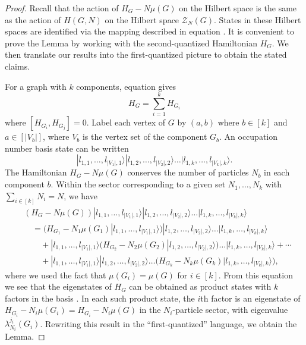 \documentclass[../thesis-main/thesis-main]{subfiles}
\begin{document}
\begin{proof}
Recall that the action of $H_{G}-N\mu(G)$ on the Hilbert space  is the same as the action of $H(G,N)$ on the Hilbert space $\mathcal{Z}_{N}(G)$. States in these Hilbert spaces are identified via the mapping described in equation . It is convenient to prove the Lemma by working with the second-quantized Hamiltonian $H_{G}$. We then translate our results into the first-quantized picture to obtain the stated claims.

For a graph with $k$ components, equation  gives 
\begin{equation}
H_{G}=\sum_{i=1}^{k}H_{G_{i}}\label{eq:H_G_disconnected}
\end{equation}
where $[H_{G_{i}},H_{G_{j}}]=0.$ Label each vertex of $G$ by $(a,b)$ where $b\in[k]$ and $a\in[|V_{b}|]$, where $V_{b}$ is the vertex set of the component $G_{b}$. An occupation number basis state  can be written 
\begin{equation}
|l_{1,1},\ldots,l_{|V_{1}|,1}\rangle|l_{1,2},\ldots,l_{|V_{2}|,2}\rangle\ldots|l_{1,k},\ldots,l_{|V_{k}|,k}\rangle.\label{eq:prod_basis_occ_num}
\end{equation}
The Hamiltonian $H_{G}-N\mu(G)$ conserves the number of particles $N_{b}$ in each component $b$. Within the sector corresponding to a given set $N_{1},\ldots,N_{k}$ with $\sum_{i \in [k]} N_i=N$, we have
\begin{align}
& \left(H_{G}-N\mu(G)\right)|l_{1,1},\ldots,l_{|V_{1}|,1}\rangle|l_{1,2},\ldots,l_{|V_{2}|,2}\rangle\ldots|l_{1,k},\ldots,l_{|V_{k}|,k}\rangle\\
&\quad =\big(H_{G_1}-N_1\mu(G_1)|l_{1,1},\ldots,l_{|V_{1}|,1}\rangle\big)|l_{1,2},\ldots,l_{|V_{2}|,2}\rangle\ldots|l_{1,k},\ldots,l_{|V_{k}|,k}\rangle\\
&\qquad+|l_{1,1},\ldots,l_{|V_{1}|,1}\rangle\big(H_{G_2}-N_2\mu(G_2)|l_{1,2},\ldots,l_{|V_{2}|,2}\rangle\big)\ldots|l_{1,k},\ldots,l_{|V_{k}|,k}\rangle + \cdots\\
&\qquad+|l_{1,1},\ldots,l_{|V_{1}|,1}\rangle|l_{1,2},\ldots,l_{|V_{2}|,2}\rangle\ldots\big(H_{G_k}-N_k\mu(G_k)|l_{1,k},\ldots,l_{|V_{k}|,k}\rangle\big),
\end{align}
where we used the fact that $\mu(G_i)=\mu(G)$ for $i\in[k]$.  From this equation we see that the eigenstates of $H_{G}$ can be obtained as product states with $k$ factors in the basis . In each such product state, the $i$th factor is an eigenstate of $H_{G_{i}}-N_{i}\mu(G_{i})=H_{G_{i}}-N_{i}\mu(G)$ in the $N_{i}$-particle sector, with eigenvalue $\lambda_{N_{i}}^{j_{i}}(G_{i})$. Rewriting this result in the ``first-quantized'' language, we obtain the Lemma. 
\end{proof}
\end{document}
